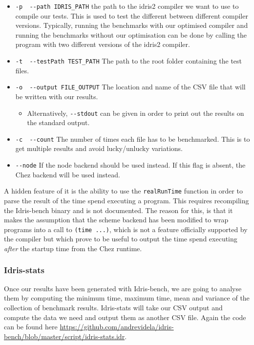 \documentclass[
]{article}
\providecommand{\tightlist}{%
  \setlength{\itemsep}{0pt}\setlength{\parskip}{0pt}}
\begin{document}
\begin{itemize}
\tightlist
\item
  \texttt{-p\ \textbar{}\ -\/-path\ IDRIS\_PATH} the path to the idris2
  compiler we want to use to compile our tests. This is used to test the
  different between different compiler versions. Typically, running the
  benchmarks with our optimised compiler and running the benchmarks
  without our optimisation can be done by calling the program with two
  different versions of the idris2 compiler.
\item
  \texttt{-t\ \textbar{}\ -\/-testPath\ TEST\_PATH} The path to the root
  folder containing the test files.
\item
  \texttt{-o\ \textbar{}\ -\/-output\ FILE\_OUTPUT} The location and
  name of the CSV file that will be written with our results.

  \begin{itemize}
  \tightlist
  \item
    Alternatively, \texttt{-\/-stdout} can be given in order to print
    out the results on the standard output.
  \end{itemize}
\item
  \texttt{-c\ \textbar{}\ -\/-count} The number of times each file has
  to be benchmarked. This is to get multiple results and avoid
  lucky/unlucky variations.
\item
  \texttt{-\/-node} If the node backend should be used instead. If this
  flag is absent, the Chez backend will be used instead.
\end{itemize}

A hidden feature of it is the ability to use the \texttt{realRunTime}
function in order to parse the result of the time spend executing a
program. This requires recompiling the Idris-bench binary and is not
documented. The reason for this, is that it makes the assumption that
the scheme backend has been modified to wrap programs into a call to
\texttt{(time\ ...)}, which is not a feature officially supported by the
compiler but which prove to be useful to output the time spend executing
\emph{after} the startup time from the Chez runtime.

\hypertarget{idris-stats}{%
\subsubsection{Idris-stats}\label{idris-stats}}

Once our results have been generated with Idris-bench, we are going to
analyse them by computing the minimum time, maximum time, mean and
variance of the collection of benchmark results. Idris-stats will take
our CSV output and compute the data we need and output them as another
CSV file. Again the code can be found here
\url{https://github.com/andrevidela/idris-bench/blob/master/script/idris-stats.idr}.
\end{document}

